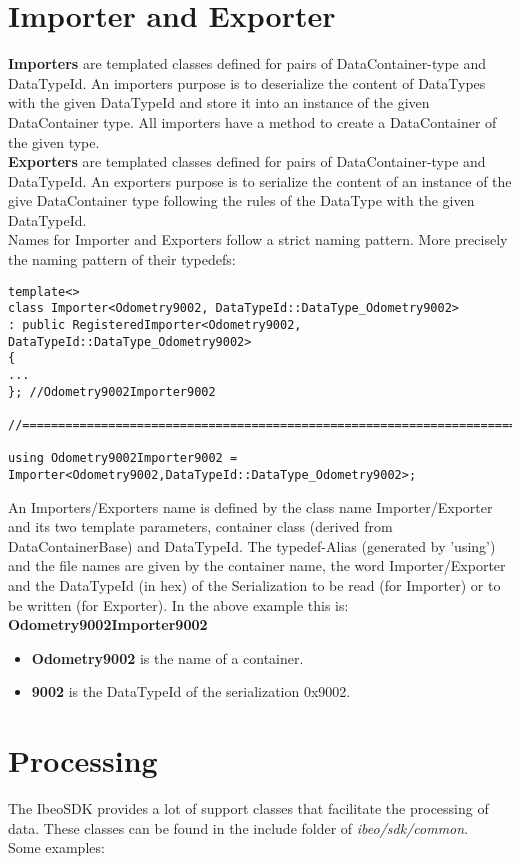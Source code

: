 \section{Importer and Exporter}\label{importer_and_exporter}
\textbf{Importers} are templated classes defined for pairs of DataContainer-type and DataTypeId. An importers purpose is to deserialize the content of DataTypes with the given DataTypeId and store it into an instance of the given 
DataContainer type.\hfill \break
All importers have a method to create a DataContainer of the given type.\hfill \break
\\
\textbf{Exporters} are templated classes defined for pairs of DataContainer-type and DataTypeId. An exporters purpose is to serialize the content of an instance of the give DataContainer type following the rules of the DataType with the given DataTypeId. \hfill \break
\\
Names for Importer and Exporters follow a strict naming pattern. More precisely the naming pattern of their typedefs:
\begin{lstlisting}
template<>
class Importer<Odometry9002, DataTypeId::DataType_Odometry9002>
: public RegisteredImporter<Odometry9002, DataTypeId::DataType_Odometry9002>
{
...
}; //Odometry9002Importer9002

//==============================================================================

using Odometry9002Importer9002 = Importer<Odometry9002,DataTypeId::DataType_Odometry9002>;
\end{lstlisting}
An Importers/Exporters name is defined by the class name Importer/Exporter and its two template parameters, container class (derived from DataContainerBase) and DataTypeId.
The typedef-Alias (generated by 'using') and the file names are given by the container name, the word Importer/Exporter and the DataTypeId (in hex) of the Serialization to be read (for Importer) or to be written (for Exporter).
In the above example this is: \hfill \break
\textbf{Odometry9002Importer9002}
\begin{itemize}
\item \textbf{Odometry9002} is the name of a container.
\item \textbf{9002} is the DataTypeId of the serialization 0x9002.
\end{itemize}
\newpage


\section{Processing}
The IbeoSDK provides a lot of support classes that facilitate the processing of data. These classes can be found in the include folder of \textit{ibeo/sdk/common}.
\\
Some examples:
